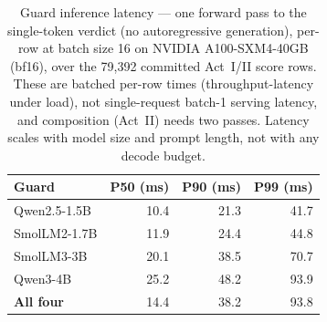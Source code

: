 \begin{table}[H]\centering\small
\caption{Guard inference latency --- one forward pass to the single-token verdict (no autoregressive generation), per-row at batch size 16 on NVIDIA A100-SXM4-40GB (bf16), over the 79,392 committed Act~I/II score rows. These are batched per-row times (throughput-latency under load), not single-request batch-1 serving latency, and composition (Act~II) needs two passes. Latency scales with model size and prompt length, not with any decode budget.}
\label{tab:latency}
\begin{tabular}{lrrr}\toprule
Guard & P50 (ms) & P90 (ms) & P99 (ms) \\
\midrule
Qwen2.5-1.5B & 10.4 & 21.3 & 41.7 \\
SmolLM2-1.7B & 11.9 & 24.4 & 44.8 \\
SmolLM3-3B & 20.1 & 38.5 & 70.7 \\
Qwen3-4B & 25.2 & 48.2 & 93.9 \\
\midrule
\textbf{All four} & 14.4 & 38.2 & 93.8 \\
\bottomrule
\end{tabular}
\end{table}
